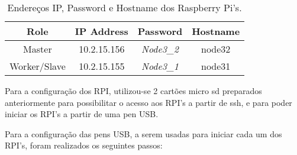     \begin{table}[h!]
        \centering

        \begin{tabular}{ c c c c }
            \hline
            \textbf{Role} & \textbf{IP Address} & \textbf{Password} & \textbf{Hostname} \\
            \hline
            Master & 10.2.15.156 & \emph{Node3\_2} & node32 \\
            Worker/Slave & 10.2.15.155 & \emph{Node3\_1} & node31 \\
            \hline
        \end{tabular}

        \caption{Endereços IP, Password e Hostname dos Raspberry Pi's.}

        \label{table:IP_address_password_hostname_rpi}
    \end{table}

    \par Para a configuração dos RPI, utilizou-se 2 cartões micro sd preparados anteriormente para possibilitar o acesso aos RPI's a partir de ssh, e para poder iniciar os RPI's a partir de uma pen USB.
    \par Para a configuração das pens USB, a serem usadas para iniciar cada um dos RPI's, foram realizados os seguintes passos:

